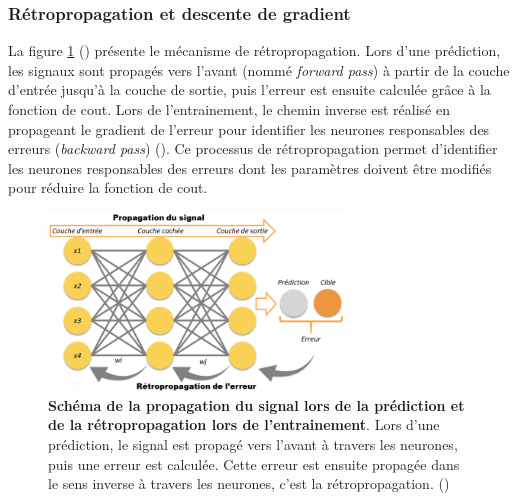 \subsubsection{Rétropropagation et descente de gradient}
La figure \ref{fig:retropop} (\cite{scalzitti_nouvelle_2021}) présente le mécanisme de rétropropagation. Lors d'une prédiction, les signaux sont propagés vers l'avant (nommé \textit{forward pass}) à partir de la couche d'entrée jusqu'à la couche de sortie, puis l'erreur est ensuite calculée grâce à la fonction de cout. Lors de l'entrainement, le chemin inverse est réalisé en propageant le gradient de l'erreur pour identifier les neurones responsables des erreurs (\textit{backward pass}) (\cite{lecun_deep_2015}). Ce processus de rétropropagation permet d'identifier les neurones responsables des erreurs dont les paramètres doivent être modifiés pour réduire la fonction de cout.
\begin{figure}[!htbp]
 \centering
 \includegraphics[width=0.7\textwidth]{figures/retro_propagation.png}
 \caption[Schéma de la rétro-propagation]{\textbf{Schéma de la propagation du signal lors de la prédiction et de la rétropropagation lors de l'entrainement}. Lors d'une prédiction, le signal est propagé vers l'avant à travers les neurones, puis une erreur est calculée. Cette erreur est ensuite propagée dans le sens inverse à travers les neurones, c'est la rétropropagation. (\cite{scalzitti_nouvelle_2021})}
 \label{fig:retropop}
\end{figure}


